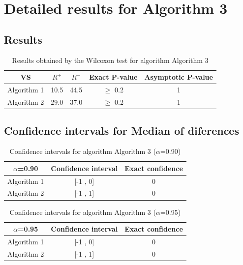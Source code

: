 \documentclass[a4paper,10pt]{article}
\begin{document}
 \clearpage 


\section{Detailed results for Algorithm 3}


\subsection{Results}

\begin{table}[!htp]
\centering\small
\begin{tabular}{
|c|c|c|c|c|}
\hline
 VS & $R^{+}$ & $R^{-}$ & Exact P-value & Asymptotic P-value \\ \hline 
Algorithm 1 & 10.5 & 44.5 & $\geq$ 0.2 & 1\\ \hline 
Algorithm 2 & 29.0 & 37.0 & $\geq$ 0.2 & 1\\ \hline 

\end{tabular}
\caption{Results obtained by the Wilcoxon test for algorithm Algorithm 3}
\end{table}

\subsection{Confidence intervals for Median of diferences}

\begin{table}[!htp]
\centering\small
\begin{tabular}{
|c|c|c|}
\hline
 $\alpha$=0.90 & Confidence interval & Exact confidence \\ \hline 
Algorithm 1 & [-1 , 0] & 0\\ \hline 
Algorithm 2 & [-1 , 1] & 0\\ \hline 

\end{tabular}
\caption{Confidence intervals for algorithm Algorithm 3 ($\alpha$=0.90)}
\end{table}
\begin{table}[!htp]
\centering\small
\begin{tabular}{
|c|c|c|}
\hline
 $\alpha$=0.95 & Confidence interval & Exact confidence \\ \hline 
Algorithm 1 & [-1 , 0] & 0\\ \hline 
Algorithm 2 & [-1 , 1] & 0\\ \hline 

\end{tabular}
\caption{Confidence intervals for algorithm Algorithm 3 ($\alpha$=0.95)}
\end{table}

 \clearpage 
\end{document}
